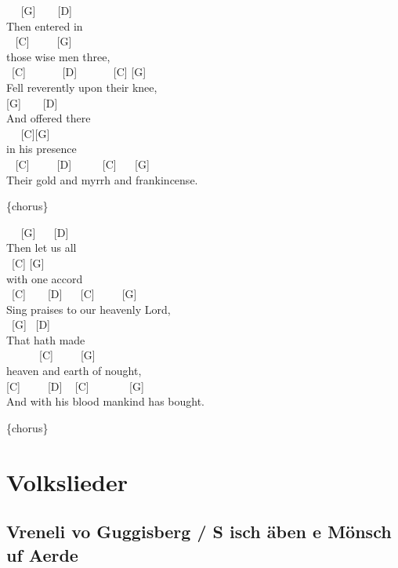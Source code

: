 \documentclass[
  letterpaper,
  twoside=false]{scrbook}
\begin{document}
~ ~{[}G{]} ~ ~ {[}D{]}\\
Then entered in\\
\hspace*{0.333em} ~ {[}C{]} ~ ~ ~{[}G{]}\\
those wise men three,\\
\hspace*{0.333em} ~{[}C{]} ~ ~ ~ ~{[}D{]} ~ ~ ~ ~{[}C{]} {[}G{]}\\
Fell reverently upon their knee,\\
\hspace*{0.333em} {[}G{]} ~ ~ {[}D{]}\\
And offered there\\
\hspace*{0.333em} ~ ~{[}C{]}{[}G{]}\\
in his presence\\
\hspace*{0.333em} ~ {[}C{]} ~ ~ ~{[}D{]} ~ ~ ~ {[}C{]} ~ ~{[}G{]}\\
Their gold and myrrh and frankincense.

\{chorus\}

~ ~{[}G{]} ~ ~{[}D{]}\\
Then let us all\\
\hspace*{0.333em} ~{[}C{]} {[}G{]}\\
with one accord ~\\
\hspace*{0.333em} ~{[}C{]} ~ ~ {[}D{]} ~ ~{[}C{]} ~ ~ ~{[}G{]}\\
Sing praises to our heavenly Lord,\\
\hspace*{0.333em} ~{[}G{]} ~{[}D{]}\\
That hath made\\
\hspace*{0.333em} ~ ~ ~ ~{[}C{]} ~ ~ ~{[}G{]}\\
heaven and earth of nought,\\
\hspace*{0.333em} {[}C{]} ~ ~ ~{[}D{]} ~ {[}C{]} ~ ~ ~ ~ {[}G{]}\\
And with his blood mankind has bought.

\{chorus\}

\part{Volkslieder}

\hypertarget{vreneli-vo-guggisberg-s-isch-uxe4ben-e-muxf6nsch-uf-aerde}{%
\chapter{Vreneli vo Guggisberg / S isch äben e Mönsch uf
Aerde}\label{vreneli-vo-guggisberg-s-isch-uxe4ben-e-muxf6nsch-uf-aerde}}
\end{document}
